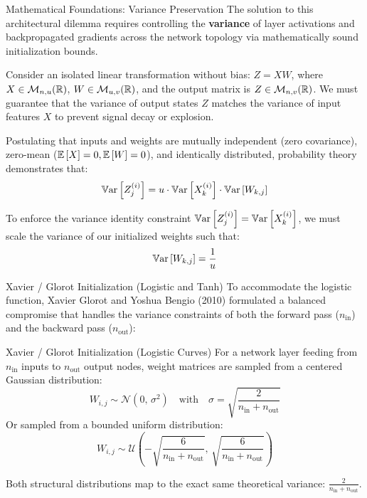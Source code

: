 \begin{frame}{Mathematical Foundations: Variance Preservation}
	The solution to this architectural dilemma requires controlling the \textbf{variance} of layer activations and backpropagated gradients across the network topology via mathematically sound initialization bounds.
	
	\pause
	
	Consider an isolated linear transformation without bias: $Z = X W$, where $X \in \mathcal{M}_{n, u}(\mathbb{R})$, $W \in \mathcal{M}_{u, v}(\mathbb{R})$, and the output matrix is $Z \in \mathcal{M}_{n, v}(\mathbb{R})$. We must guarantee that the variance of output states $Z$ matches the variance of input features $X$ to prevent signal decay or explosion.
	
	\pause
	
	Postulating that inputs and weights are mutually independent (zero covariance), zero-mean ($\operatorname{\mathbb{E}}\left[X\right]=0, \operatorname{\mathbb{E}}\left[W\right]=0$), and identically distributed, probability theory demonstrates that:
	\begin{equation*}
		\operatorname{\mathbb{V}ar}\left[Z^{(i)}_j\right] = u \cdot \operatorname{\mathbb{V}ar}\left[X^{(i)}_k\right] \cdot \operatorname{\mathbb{V}ar}\left[W_{k,j}\right]
	\end{equation*}
	
	\pause

	To enforce the variance identity constraint $\operatorname{\mathbb{V}ar}\left[Z^{(i)}_j\right] = \operatorname{\mathbb{V}ar}\left[X^{(i)}_k\right]$, we must scale the variance of our initialized weights such that:
	\begin{equation*}
		\operatorname{\mathbb{V}ar}\left[W_{k,j}\right] = \frac{1}{u}
	\end{equation*}
\end{frame}

\begin{frame}{Xavier / Glorot Initialization (Logistic and Tanh)}
	To accommodate the logistic function, Xavier Glorot and Yoshua Bengio (2010) formulated a balanced compromise that handles the variance constraints of both the forward pass ($n_{\text{in}}$) and the backward pass ($n_{\text{out}}$):
	
	\begin{block}{Xavier / Glorot Initialization (Logistic Curves)}
		For a network layer feeding from $n_{\text{in}}$ inputs to $n_{\text{out}}$ output nodes, weight matrices are sampled from a centered Gaussian distribution:
		\begin{equation*}
			W_{i,j} \sim \mathcal{N}\left(0, \, \sigma^2\right) \quad \text{with} \quad \sigma = \sqrt{\frac{2}{n_{\text{in}} + n_{\text{out}}}}
		\end{equation*}
		Or sampled from a bounded uniform distribution:
		\begin{equation*}
			W_{i,j} \sim \mathcal{U}\left(-\sqrt{\frac{6}{n_{\text{in}} + n_{\text{out}}}}, \, \sqrt{\frac{6}{n_{\text{in}} + n_{\text{out}}}}\right)
		\end{equation*}
		
		\vspace{-0.2cm}
		
		Both structural distributions map to the exact same theoretical variance: $\frac{2}{n_{\text{in}} + n_{\text{out}}}$.
	\end{block}
\end{frame}

